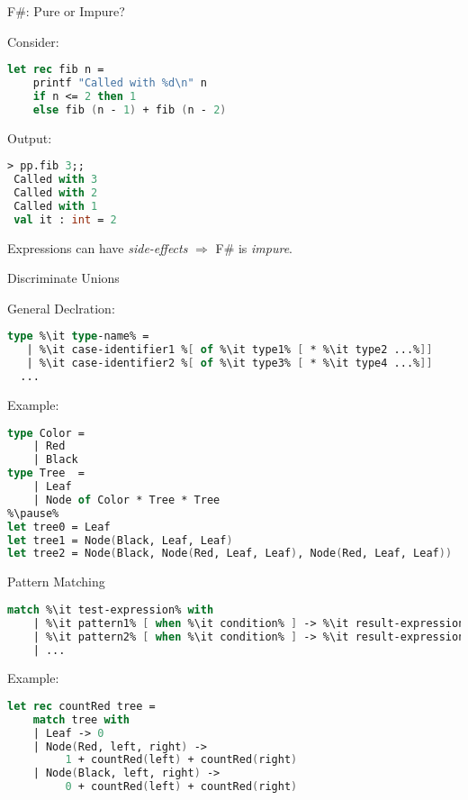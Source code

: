 \documentclass{beamer}
\begin{document}
\begin{frame}[fragile]{F\#: Pure or Impure?}

Consider:
\begin{lstlisting}[language=FSharp]
let rec fib n = 
    printf "Called with %d\n" n
    if n <= 2 then 1 
    else fib (n - 1) + fib (n - 2)
\end{lstlisting}  
\pause
Output:
\begin{lstlisting}[language=FSharp]
> pp.fib 3;;
 Called with 3 
 Called with 2 
 Called with 1 
 val it : int = 2
\end{lstlisting}
\bigskip

\begin{center}
  Expressions can have \emph{side-effects} $\Rightarrow$ F\# is \emph{impure}.
\end{center}
\end{frame}


\begin{frame}[fragile]{Discriminate Unions}

General Declration:

\begin{lstlisting}[language=FSharp, escapechar=\%]
type %\it type-name% = 
   | %\it case-identifier1 %[ of %\it type1% [ * %\it type2 ...%]]
   | %\it case-identifier2 %[ of %\it type3% [ * %\it type4 ...%]]
  ...
\end{lstlisting}

Example:

\begin{lstlisting}[language=FSharp, escapechar=\%]
type Color = 
    | Red 
    | Black
type Tree  =
    | Leaf 
    | Node of Color * Tree * Tree
%\pause%
let tree0 = Leaf
let tree1 = Node(Black, Leaf, Leaf)
let tree2 = Node(Black, Node(Red, Leaf, Leaf), Node(Red, Leaf, Leaf))
\end{lstlisting}
\end{frame}

\begin{frame}[fragile]{Pattern Matching}
\begin{lstlisting}[language=FSharp, escapechar=\%]
match %\it test-expression% with
    | %\it pattern1% [ when %\it condition% ] -> %\it result-expression1%
    | %\it pattern2% [ when %\it condition% ] -> %\it result-expression2%
    | ...
\end{lstlisting}

\pause

Example:
\begin{lstlisting}[language=FSharp, escapechar=\%]
let rec countRed tree =
    match tree with
    | Leaf -> 0
    | Node(Red, left, right) ->
         1 + countRed(left) + countRed(right)
    | Node(Black, left, right) ->
         0 + countRed(left) + countRed(right)
\end{lstlisting}
\end{frame}
\end{document}
